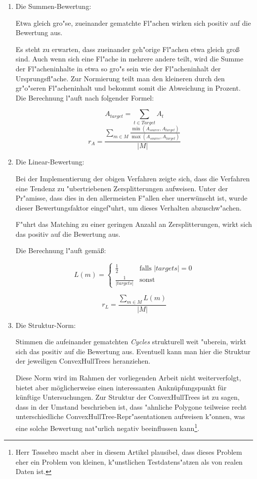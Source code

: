 \begin{enumerate}
\item Die Summen-Bewertung:


Etwa gleich gro"se, zueinander gematchte Fl"achen wirken sich positiv auf die Bewertung aus.

Es steht zu erwarten, dass zueinander geh"orige Fl"achen etwa gleich groß sind. Auch wenn sich eine Fl"ache in mehrere andere teilt, wird die Summe der Fl"acheninhalte in etwa so gro"s sein wie der Fl"acheninhalt der Ursprungsfl"ache. Zur Normierung teilt man den kleineren durch den gr"o"seren Fl"acheninhalt und bekommt somit die Abweichung in Prozent. Die Berechnung l"auft nach folgender Formel:

$$A_{target}=\sum_{t\in Target}A_t$$
$$r_A=\frac {\sum_{m\in M}\frac{\min({A_{source},A_{target}})}{\max({A_{source},A_{target}})}}{|M|}$$



\item Die Linear-Bewertung:

Bei der Implementierung der obigen Verfahren zeigte sich, dass die Verfahren eine Tendenz zu "ubertriebenen Zersplitterungen aufweisen. Unter der Pr"amisse, dass dies in den allermeisten F"allen eher unerwünscht ist, wurde dieser Bewertungsfaktor eingef"uhrt, um dieses Verhalten abzuschw"achen.

F"uhrt das Matching zu einer geringen Anzahl an Zersplitterungen, wirkt sich das positiv auf die Bewertung aus.

Die Berechnung l"auft gemäß:

$$L(m)=
\begin{cases}
	\frac{1}{2} & \text{falls }|targets|=0\\
	\frac{1}{|targets|} & \text{sonst}
    \end{cases}
$$

$$r_L=\frac{\sum_{m\in M}L(m)}{|M|}$$

\item Die Struktur-Norm:

Stimmen die aufeinander gematchten \textit{Cycles} strukturell weit "uberein, wirkt sich das positiv auf die Bewertung aus. Eventuell kann man hier die Struktur der jeweiligen ConvexHullTrees heranziehen.

Diese Norm wird im Rahmen der vorliegenden Arbeit nicht weiterverfolgt, bietet aber möglicherweise einen interessanten Anknüpfungspunkt für künftige Untersuchungen. Zur Struktur der ConvexHullTrees ist zu sagen, dass in \cite{TG} der Umstand beschrieben ist, dass "ahnliche Polygone teilweise recht unterschiedliche ConvexHullTree-Repr"asentationen aufweisen k"onnen, was eine solche Bewertung nat"urlich negativ beeinflussen kann\footnote{Herr T\o{}ssebro macht aber in diesem Artikel plausibel, dass dieses Problem eher ein Problem von kleinen, k"unstlichen Testdatens"atzen als von realen Daten ist.}.


\end{enumerate} 

